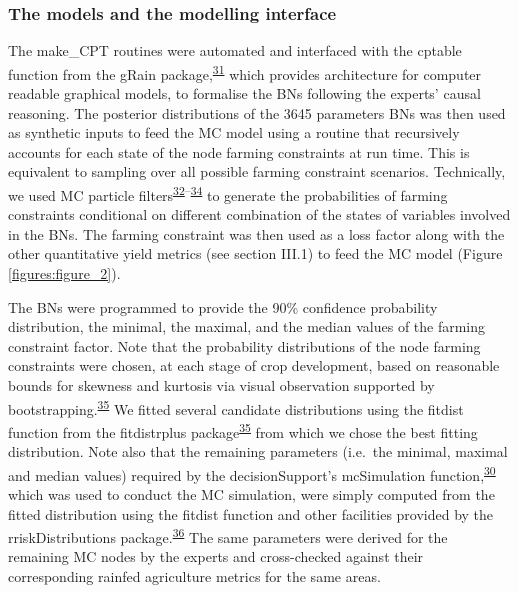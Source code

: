 \documentclass[12pt,oneside]{article}
\begin{document}
\hypertarget{the-models-and-the-modelling-interface}{%
\subsubsection{The models and the modelling
interface}\label{the-models-and-the-modelling-interface}}

The make\_CPT routines were automated and interfaced with the cptable
function from the gRain
package,\textsuperscript{\protect\hyperlink{ref-Hojsgaard_2012}{31}}
which provides architecture for computer readable graphical models, to
formalise the BNs following the experts' causal reasoning. The posterior
distributions of the 3645 parameters BNs was then used as synthetic
inputs to feed the MC model using a routine that recursively accounts
for each state of the node farming constraints at run time. This is
equivalent to sampling over all possible farming constraint scenarios.
Technically, we used MC particle
filters\textsuperscript{\protect\hyperlink{ref-Kitagawa_2016}{32}--\protect\hyperlink{ref-Scutari_2010}{34}}
to generate the probabilities of farming constraints conditional on
different combination of the states of variables involved in the BNs.
The farming constraint was then used as a loss factor along with the
other quantitative yield metrics (see section III.1) to feed the MC
model (Figure \ref{figures:figure_2}).

The BNs were programmed to provide the 90\% confidence probability
distribution, the minimal, the maximal, and the median values of the
farming constraint factor. Note that the probability distributions of
the node farming constraints were chosen, at each stage of crop
development, based on reasonable bounds for skewness and kurtosis via
visual observation supported by
bootstrapping.\textsuperscript{\protect\hyperlink{ref-Delignette-Muller_and_Dutang_2015}{35}}
We fitted several candidate distributions using the fitdist function
from the fitdistrplus
package\textsuperscript{\protect\hyperlink{ref-Delignette-Muller_and_Dutang_2015}{35}}
from which we chose the best fitting distribution. Note also that the
remaining parameters (i.e.~the minimal, maximal and median values)
required by the decisionSupport's mcSimulation
function,\textsuperscript{\protect\hyperlink{ref-Luedeling_and_Goehring_2018}{30}}
which was used to conduct the MC simulation, were simply computed from
the fitted distribution using the fitdist function and other facilities
provided by the rriskDistributions
package.\textsuperscript{\protect\hyperlink{ref-Belgorodski_et_al_2017}{36}}
The same parameters were derived for the remaining MC nodes by the
experts and cross-checked against their corresponding rainfed
agriculture metrics for the same areas.
\end{document}
